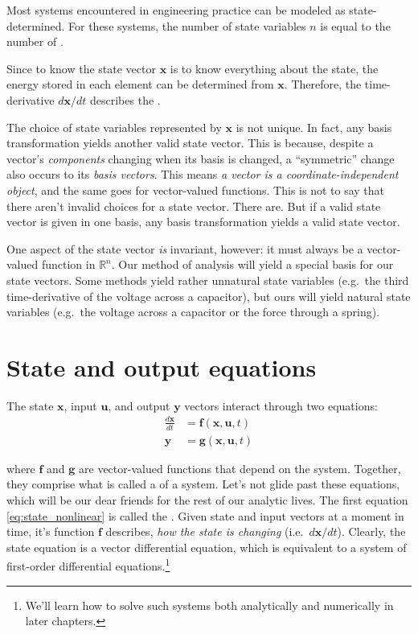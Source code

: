 \documentclass[dynamic_systems.tex]{subfiles}
\begin{document}
Most systems encountered in engineering practice can be modeled as state-determined.
For these systems, the number of state variables $n$ is equal to the number of .
\tags{}

Since to know the state vector $\bm{x}$ is to know everything about the state, the energy stored in each element can be determined from $\bm{x}$.
Therefore, the time-derivative $d\bm{x}/dt$ describes the .
\tags{}

The choice of state variables represented by $\bm{x}$ is not unique.
In fact, any basis transformation yields another valid state vector.
This is because, despite a vector's \emph{components} changing when its basis is changed, a ``symmetric'' change also occurs to its \emph{basis vectors}.
This means \emph{a vector is a coordinate-independent object}, and the same goes for vector-valued functions.
This is not to say that there aren't invalid choices for a state vector.
There are.
But if a valid state vector is given in one basis, any basis transformation yields a valid state vector.
\tags{}

One aspect of the state vector \emph{is} invariant, however: it must always be a vector-valued function in $\mathbb{R}^n$.
Our method of analysis will yield a special basis for our state vectors.
Some methods yield rather unnatural state variables (e.g.\ the third time-derivative of the voltage across a capacitor), but ours will yield natural state variables (e.g.\ the voltage across a capacitor or the force through a spring).

\section{State and output equations}
\tags{}

The state $\bm{x}$, input $\bm{u}$, and output $\bm{y}$ vectors interact through two equations:
\begin{subequations}
\begin{align}
	\frac{d\bm{x}}{d t} &= \bm{f}(\bm{x},\bm{u},t) \label{eq:state_nonlinear} \\
	\bm{y} &= \bm{g}(\bm{x},\bm{u},t)\label{eq:output_nonlinear}
\end{align}
\end{subequations}

where $\bm{f}$ and $\bm{g}$ are vector-valued functions that depend on the system.
Together, they comprise what is called a  of a system.
Let's not glide past these equations, which will be our dear friends for the rest of our analytic lives.
The first equation \eqref{eq:state_nonlinear} is called the .
Given state and input vectors at a moment in time, it's function $\bm{f}$ describes, \emph{how the state is changing} (i.e.\ $d\bm{x}/d t$).
Clearly, the state equation is a vector differential equation, which is equivalent to a system of first-order differential equations.\footnote{We'll learn how to solve such systems both analytically and numerically in later chapters.}
\tags{}
\end{document}
